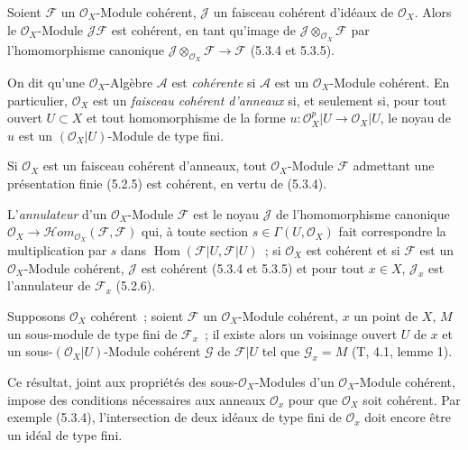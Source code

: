 \begin{env}[5.3.6]
\label{0.5.3.6-fr}
Soient $\mathcal{F}$ un $\mathcal{O}_X$-Module cohérent, $\mathcal{J}$ un
faisceau cohérent d'idéaux de $\mathcal{O}_X$. Alors le
$\mathcal{O}_X$-Module $\mathcal{J}\mathcal{F}$ est cohérent, en tant qu'image
de $\mathcal{J}\otimes_{\mathcal{O}_X}\mathcal{F}$ par l'homomorphisme
canonique
$\mathcal{J}\otimes_{\mathcal{O}_X}\mathcal{F}\to\mathcal{F}$
(5.3.4 et 5.3.5).
\end{env}

\begin{env}[5.3.7]
\label{0.5.3.7-fr}
On dit qu'une $\mathcal{O}_X$-Algèbre $\mathcal{A}$ est \emph{cohérente} si
$\mathcal{A}$ est un $\mathcal{O}_X$-Module cohérent. En particulier,
$\mathcal{O}_X$ est un \emph{faisceau cohérent d'anneaux} si, et seulement si,
pour tout ouvert $U\subset X$ et tout homomorphisme de la forme
$u:\mathcal{O}_X^p|U\to\mathcal{O}_X|U$, le noyau de $u$ est un
$(\mathcal{O}_X|U)$-Module de type fini.

Si $\mathcal{O}_X$ est un faisceau cohérent d'anneaux, tout
$\mathcal{O}_X$-Module $\mathcal{F}$ admettant une présentation finie (5.2.5)
est cohérent, en vertu de (5.3.4).

L'\emph{annulateur} d'un $\mathcal{O}_X$-Module $\mathcal{F}$ est le noyau
$\mathcal{J}$ de l'homomorphisme canonique
$\mathcal{O}_X\to\mathcal{H}\!om_{\mathcal{O}_X}(\mathcal{F},\mathcal{F})$
qui, à toute section $s\in\Gamma(U,\mathcal{O}_X)$ fait correspondre la
multiplication par $s$ dans
$\operatorname{Hom}(\mathcal{F}|U,\mathcal{F}|U)$~; si $\mathcal{O}_X$ est
cohérent et si $\mathcal{F}$ est un $\mathcal{O}_X$-Module cohérent,
$\mathcal{J}$ est cohérent (5.3.4 et 5.3.5) et pour tout $x\in X$,
$\mathcal{J}_x$ est l'annulateur de $\mathcal{F}_x$ (5.2.6).
\end{env}


\begin{env}[5.3.8]
\label{0.5.3.8-fr}
Supposons $\mathcal{O}_X$ cohérent~; soient $\mathcal{F}$ un
$\mathcal{O}_X$-Module cohérent, $x$ un point de $X$, $M$ un sous-module de
type fini de $\mathcal{F}_x$~; il existe alors un voisinage ouvert $U$ de $x$
et un sous-$(\mathcal{O}_X|U)$-Module cohérent $\mathcal{G}$ de
$\mathcal{F}|U$ tel que $\mathcal{G}_x=M$ (T, 4.1, lemme 1).

Ce résultat, joint aux propriétés des sous-$\mathcal{O}_X$-Modules d'un
$\mathcal{O}_X$-Module cohérent, impose des conditions nécessaires aux anneaux
$\mathcal{O}_x$ pour que $\mathcal{O}_X$ soit cohérent. Par exemple (5.3.4),
l'intersection de deux idéaux de type fini de $\mathcal{O}_x$ doit encore être
un idéal de type fini.
\end{env}


